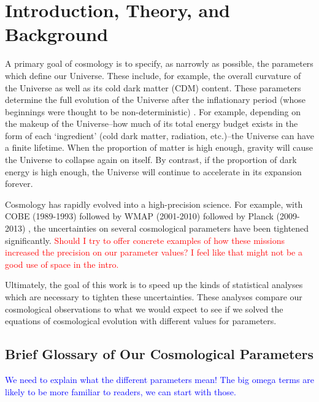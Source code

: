 \chapter{Introduction, Theory, and Background}


A primary goal of cosmology is to specify, as narrowly as possible, the 
parameters which define our Universe. These include, for example, the overall 
curvature of the Universe as well as its cold dark matter (CDM) content. These
parameters determine the full evolution of the Universe after the inflationary
period (whose beginnings were thought to be non-deterministic)
. For example, depending on
the makeup of the Universe--how much of its total energy budget exists in the
form of each `ingredient' (cold dark matter, radiation, etc.)--the Universe
can have a finite lifetime. When the proportion of matter is high enough,
gravity will cause the Universe to collapse again on itself. By contrast, if
the proportion of dark energy is high enough, the Universe will continue to
accelerate in its expansion forever.

Cosmology has rapidly evolved into a high-precision science. For example, with
COBE (1989-1993)  followed by WMAP (2001-2010)  followed 
by Planck (2009-2013) , the uncertainties on several cosmological 
parameters have been tightened significantly.
\textcolor{red}{Should I try to offer concrete examples of how these missions
increased the precision on our parameter values? I feel like that might not be
a good use of space in the intro.}

Ultimately, the goal of this work is to speed up the kinds of statistical
analyses which are necessary to tighten these uncertainties.
These analyses compare our cosmological observations to what we
would expect to see if we solved the equations of cosmological evolution with
different values for parameters.

\section{Brief Glossary of Our Cosmological Parameters}
\label{sec: param_glossary}

\textcolor{blue}{We need to explain what the different parameters mean! The
big omega terms are likely to be more familiar to readers, we can start with 
those.}

